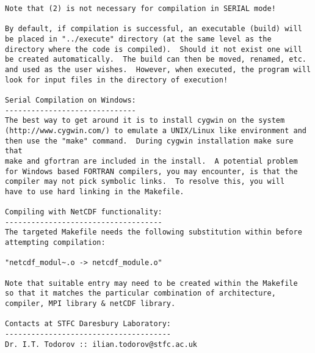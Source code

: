 \begin{verbatim}
Note that (2) is not necessary for compilation in SERIAL mode!

By default, if compilation is successful, an executable (build) will
be placed in "../execute" directory (at the same level as the
directory where the code is compiled).  Should it not exist one will
be created automatically.  The build can then be moved, renamed, etc.
and used as the user wishes.  However, when executed, the program will
look for input files in the directory of execution!

Serial Compilation on Windows:
------------------------------
The best way to get around it is to install cygwin on the system
(http://www.cygwin.com/) to emulate a UNIX/Linux like environment and
then use the "make" command.  During cygwin installation make sure that
make and gfortran are included in the install.  A potential problem
for Windows based FORTRAN compilers, you may encounter, is that the
compiler may not pick symbolic links.  To resolve this, you will
have to use hard linking in the Makefile.

Compiling with NetCDF functionality:
------------------------------------
The targeted Makefile needs the following substitution within before
attempting compilation:

"netcdf_modul~.o -> netcdf_module.o"

Note that suitable entry may need to be created within the Makefile
so that it matches the particular combination of architecture,
compiler, MPI library & netCDF library.

Contacts at STFC Daresbury Laboratory:
--------------------------------------
Dr. I.T. Todorov :: ilian.todorov@stfc.ac.uk
\end{verbatim}
